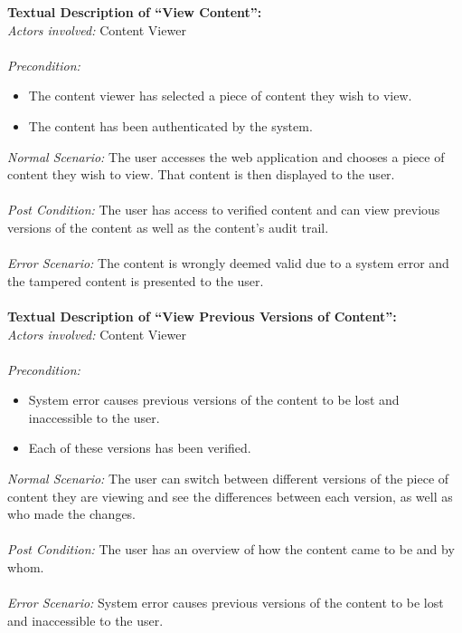 \newpage
\noindent
\textbf{Textual Description of “View Content”:} \\
\textit{Actors involved:} Content Viewer \\ \\
\textit{Precondition:} 
	\begin{itemize}
		\item The content viewer has selected a piece of content they wish to view.
		\item The content has been authenticated by the system. 
	\end{itemize}
\textit{Normal Scenario:} The user accesses the web application and chooses a piece of content 
					      they wish to view. That content is then displayed to the user. \\ \\
\textit{Post Condition:} The user has access to verified content and can view previous versions 
						 of the content as well as the content’s audit trail. \\ \\
\textit{Error Scenario:} The content is wrongly deemed valid due to a system error and 
						 the tampered content is presented to the user. \\ \\

\noindent
\textbf{Textual Description of “View Previous Versions of Content”:} \\
\textit{Actors involved:} Content Viewer \\ \\	
\textit{Precondition:} 
	\begin{itemize}
		\item System error causes previous versions of the content to be lost and inaccessible to the user. 
		\item Each of these versions has been verified.
	\end{itemize}
\textit{Normal Scenario:} The user can switch between different versions of the piece of content 
						  they are viewing and see the differences between each version, 
						  as well as who made the changes. \\ \\
\textit{Post Condition:} The user has an overview of how the content came to be and by whom. \\ \\
\textit{Error Scenario:} System error causes previous versions of the content to be lost and inaccessible to the user.\\ \\

